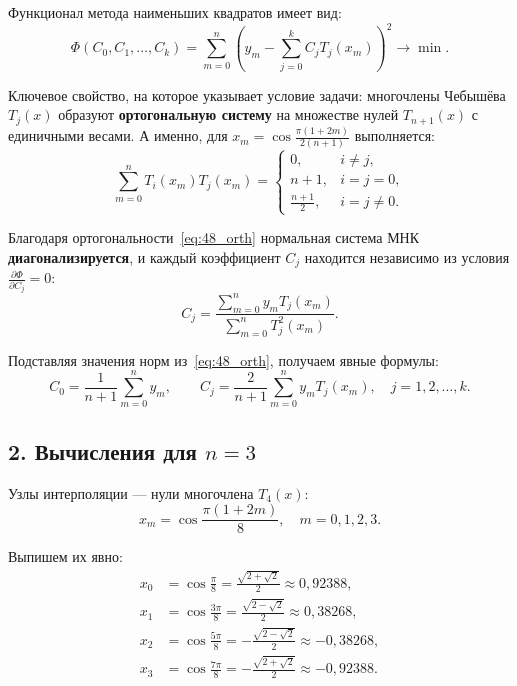 \documentclass{article}
\begin{document}
Функционал метода наименьших квадратов имеет вид:
\begin{equation}
\Phi(C_0, C_1, \ldots, C_k) = \sum_{m=0}^{n} \left(y_m - \sum_{j=0}^{k} C_j T_j(x_m)\right)^2 \to \min.
\end{equation}

Ключевое свойство, на которое указывает условие задачи: многочлены Чебышёва $T_j(x)$ образуют \textbf{ортогональную систему} на множестве нулей $T_{n+1}(x)$ с единичными весами. А именно, для $x_m = \cos\frac{\pi(1+2m)}{2(n+1)}$ выполняется:
\begin{equation}
\sum_{m=0}^{n} T_i(x_m) T_j(x_m) = 
\begin{cases} 
0, & i \neq j, \\
n+1, & i = j = 0, \\
\frac{n+1}{2}, & i = j \neq 0.
\end{cases}
\label{eq:48_orth}
\end{equation}

Благодаря ортогональности~\eqref{eq:48_orth} нормальная система МНК \textbf{диагонализируется}, и каждый коэффициент $C_j$ находится независимо из условия $\frac{\partial \Phi}{\partial C_j} = 0$:
\begin{equation}
C_j = \frac{\displaystyle\sum_{m=0}^{n} y_m T_j(x_m)}{\displaystyle\sum_{m=0}^{n} T_j^2(x_m)}.
\label{eq:48_cj}
\end{equation}

Подставляя значения норм из~\eqref{eq:48_orth}, получаем явные формулы:
\begin{equation}
C_0 = \frac{1}{n+1} \sum_{m=0}^{n} y_m, \qquad C_j = \frac{2}{n+1} \sum_{m=0}^{n} y_m T_j(x_m), \quad j = 1, 2, \ldots, k.
\label{eq:48_cj_expl}
\end{equation}

\subsection*{2. Вычисления для $n = 3$}

Узлы интерполяции --- нули многочлена $T_4(x)$:
\begin{equation}
x_m = \cos\frac{\pi(1+2m)}{8}, \quad m = 0, 1, 2, 3.
\end{equation}

Выпишем их явно:
\begin{align}
x_0 &= \cos\frac{\pi}{8} = \frac{\sqrt{2+\sqrt{2}}}{2} \approx 0{,}92388, \\
x_1 &= \cos\frac{3\pi}{8} = \frac{\sqrt{2-\sqrt{2}}}{2} \approx 0{,}38268, \\
x_2 &= \cos\frac{5\pi}{8} = -\frac{\sqrt{2-\sqrt{2}}}{2} \approx -0{,}38268, \\
x_3 &= \cos\frac{7\pi}{8} = -\frac{\sqrt{2+\sqrt{2}}}{2} \approx -0{,}92388.
\end{align}
\end{document}
